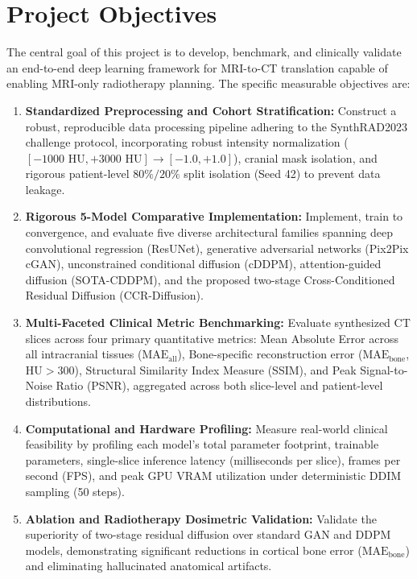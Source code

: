 \section{Project Objectives}
The central goal of this project is to develop, benchmark, and clinically validate an end-to-end deep learning framework for MRI-to-CT translation capable of enabling MRI-only radiotherapy planning. The specific measurable objectives are:
\begin{enumerate}[label=\textbf{\arabic*.}]
    \item \textbf{Standardized Preprocessing and Cohort Stratification:} Construct a robust, reproducible data processing pipeline adhering to the SynthRAD2023 challenge protocol, incorporating robust intensity normalization ($[-1000\text{ HU}, +3000\text{ HU}] \to [-1.0, +1.0]$), cranial mask isolation, and rigorous patient-level $80\%/20\%$ split isolation (Seed 42) to prevent data leakage.
    \item \textbf{Rigorous 5-Model Comparative Implementation:} Implement, train to convergence, and evaluate five diverse architectural families spanning deep convolutional regression (ResUNet), generative adversarial networks (Pix2Pix cGAN), unconstrained conditional diffusion (cDDPM), attention-guided diffusion (SOTA-CDDPM), and the proposed two-stage Cross-Conditioned Residual Diffusion (CCR-Diffusion).
    \item \textbf{Multi-Faceted Clinical Metric Benchmarking:} Evaluate synthesized CT slices across four primary quantitative metrics: Mean Absolute Error across all intracranial tissues ($\text{MAE}_{\text{all}}$), Bone-specific reconstruction error ($\text{MAE}_{\text{bone}}$, $\text{HU} > 300$), Structural Similarity Index Measure (SSIM), and Peak Signal-to-Noise Ratio (PSNR), aggregated across both slice-level and patient-level distributions.
    \item \textbf{Computational and Hardware Profiling:} Measure real-world clinical feasibility by profiling each model's total parameter footprint, trainable parameters, single-slice inference latency (milliseconds per slice), frames per second (FPS), and peak GPU VRAM utilization under deterministic DDIM sampling (50 steps).
    \item \textbf{Ablation and Radiotherapy Dosimetric Validation:} Validate the superiority of two-stage residual diffusion over standard GAN and DDPM models, demonstrating significant reductions in cortical bone error ($\text{MAE}_{\text{bone}}$) and eliminating hallucinated anatomical artifacts.
\end{enumerate}


